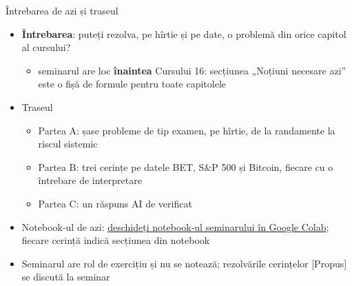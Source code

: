\begin{frame}{Întrebarea de azi și traseul}
\itemsize{\small}
\begin{itemize}
    \item \textbf{Întrebarea}: puteți rezolva, pe hîrtie și pe date, o problemă din orice capitol al cursului?
    \begin{itemize}
        \item seminarul are loc \textbf{înaintea} Cursului 16: secțiunea „Noțiuni necesare azi” este o fișă de formule pentru toate capitolele
    \end{itemize}
    \item Traseul
    \begin{itemize}
        \item Partea A: șase probleme de tip examen, pe hîrtie, de la randamente la riscul sistemic
        \item Partea B: trei cerințe pe datele BET, S\&P 500 și Bitcoin, fiecare cu o întrebare de interpretare
        \item Partea C: un răspuns AI de verificat
    \end{itemize}
    \item Notebook-ul de azi: \href{\nb}{deschideți notebook-ul seminarului în Google Colab}; fiecare cerință indică secțiunea din notebook
    \item Seminarul are rol de exercițiu și nu se notează; rezolvările cerințelor [Propus] se discută la seminar
\end{itemize}
\end{frame}

